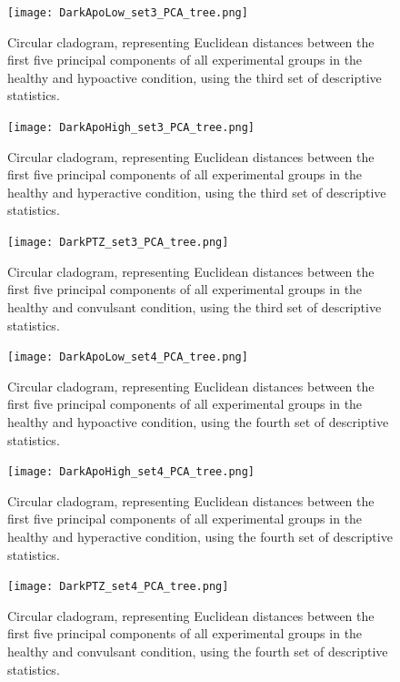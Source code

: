 \documentclass[a4paper,12pt]{article}
\begin{document}
\begin{figure}[h!]
\begin{center}
\texttt{[image: DarkApoLow\_set3\_PCA\_tree.png]}
\caption{Circular cladogram, representing Euclidean distances between the first five principal components of all experimental groups in the healthy and hypoactive condition, using the third set of descriptive statistics.}
\end{center}
\end{figure}
\begin{figure}[h!]
\begin{center}
\texttt{[image: DarkApoHigh\_set3\_PCA\_tree.png]}
\caption{Circular cladogram, representing Euclidean distances between the first five principal components of all experimental groups in the healthy and hyperactive condition, using the third set of descriptive statistics.}
\end{center}
\end{figure}
\begin{figure}[h!]
\begin{center}
\texttt{[image: DarkPTZ\_set3\_PCA\_tree.png]}
\caption{Circular cladogram, representing Euclidean distances between the first five principal components of all experimental groups in the healthy and convulsant condition, using the third set of descriptive statistics.}
\end{center}
\end{figure}

\begin{figure}[h!]
\begin{center}
\texttt{[image: DarkApoLow\_set4\_PCA\_tree.png]}
\caption{Circular cladogram, representing Euclidean distances between the first five principal components of all experimental groups in the healthy and hypoactive condition, using the fourth set of descriptive statistics.}
\end{center}
\end{figure}
\begin{figure}[h!]
\begin{center}
\texttt{[image: DarkApoHigh\_set4\_PCA\_tree.png]}
\caption{Circular cladogram, representing Euclidean distances between the first five principal components of all experimental groups in the healthy and hyperactive condition, using the fourth set of descriptive statistics.}
\end{center}
\end{figure}
\begin{figure}[h!]
\begin{center}
\texttt{[image: DarkPTZ\_set4\_PCA\_tree.png]}
\caption{Circular cladogram, representing Euclidean distances between the first five principal components of all experimental groups in the healthy and convulsant condition, using the fourth set of descriptive statistics.}
\end{center}
\end{figure}
\end{document}
